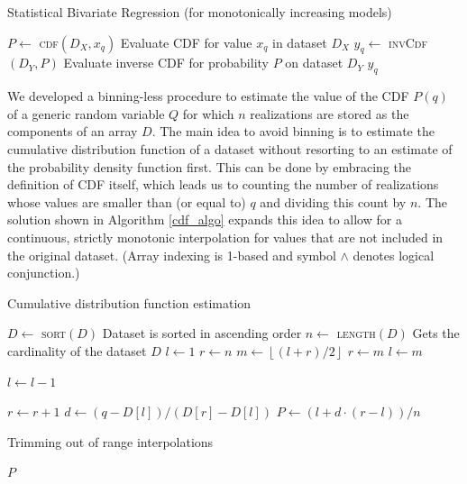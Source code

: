 \documentclass[10pt,final]{siamltex}
\begin{document}
\begin{algorithm}
  \caption{Statistical Bivariate Regression (for monotonically increasing models)}
  \label{regression_algo}
  \begin{algorithmic}[1]
    \State $P \gets$ \textsc{cdf}$(D_X, x_q)$
    \Comment Evaluate CDF for value $x_q$ in dataset $D_X$
    \State $y_q \gets$ \textsc{invCdf}$(D_Y, P)$
    \Comment Evaluate inverse CDF for probability $P$ on dataset $D_Y$
    \State \Return $y_q$
    \EndFunction
  \end{algorithmic}
\end{algorithm}
%

We developed a binning-less procedure to estimate the value of the CDF $P(q)$ of a generic random variable $Q$ for which $n$ realizations are stored as the components of an array $D$.
The main idea to avoid binning is to estimate the cumulative distribution function of a dataset without resorting to an estimate of the probability density function first. This can be done by embracing the definition of CDF itself, which leads us to counting the number of realizations whose values are smaller than (or equal to) $q$ and dividing this count by $n$. The solution shown in Algorithm \ref{cdf_algo} expands this idea to allow for a continuous, strictly monotonic interpolation for values that are not included in the original dataset. (Array indexing is 1-based and symbol $\land$ denotes logical conjunction.)

\begin{algorithm}
  \caption{Cumulative distribution function estimation}
  \label{cdf_algo}
  \begin{algorithmic}[1]
    \State $D \gets$ \textsc{sort}$(D)$
    \Comment Dataset is sorted in ascending order
    \State $n \gets$ \textsc{length}$(D)$
    \Comment Gets the cardinality of the dataset $D$
    \State $l \gets 1$
    \State $r \gets n$
    \State $m \gets \left \lfloor{(l+r)/2}\right \rfloor$
    \State $r \gets m$
    \Else
    \State $l \gets m$
    \EndIf
    \EndWhile


    \State $l \gets l - 1$
    \EndWhile

    \State $r \gets r + 1$
    \EndWhile
    \State $d \gets (q-D[l])/(D[r]-D[l])$
    \State $P \gets (l + d \cdot (r - l))/n $

     \Comment Trimming out of range interpolations
    \EndIf

    \State \Return $P$
    \EndFunction
  \end{algorithmic}
\end{algorithm}
\end{document}
